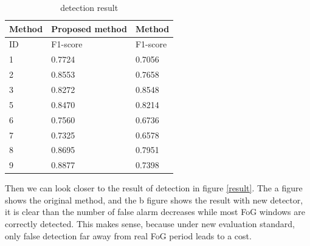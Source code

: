 \documentclass[article]{article}
\begin{document}
 \begin{table}
    \begin{center}
   		\begin{tabular}{  |p{0.5cm}||p{1.5cm}|p{1.5cm}| }
		\hline
		\multicolumn{1}{|c|}{Method}
		&\multicolumn{1}{|c|}{Proposed method}  &\multicolumn{1}{|c|}{Method\cite{FI1}}  \\
	
		\hline
		 ID &   F1-score  &  F1-score \\
		\hline
		1  & 0.7724 & 0.7056 \\
		2 & 0.8553   & 0.7658\\ 
		
		3 & 0.8272 & 0.8548 \\   
		
		5& 0.8470  & 0.8214 \\
		
		6 &  0.7560 & 0.6736 \\
		
		7  & 0.7325  & 0.6578\\
		
		8   & 0.8695  & 0.7951   \\	
		
		9  & 0.8877   & 0.7398\\
		\hline
		\end{tabular}
	\caption{detection result}
\end{center}
     \end{table}
   Then we can look closer to the result of detection in figure \ref{result}. The a figure shows the original method, and the b figure shows the result with new detector, it is clear than the number of false alarm decreases while most FoG windows are correctly detected. This makes sense, because under new evaluation standard, only false detection far away from real FoG period leads to a cost.
   
 
    
\end{document}
